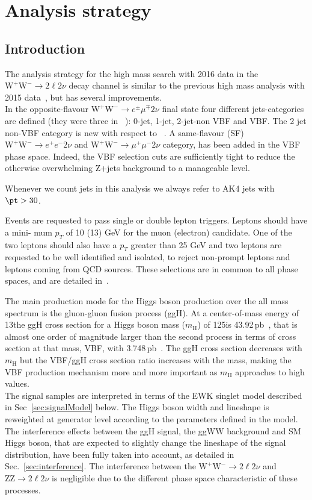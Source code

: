 \section{Analysis strategy}\label{sec:AnalysisStrategy}

\subsection{Introduction}
The analysis strategy for the high mass search with 2016 data in the
$\mathrm{W^+W^-}\to2\ell2\nu$ decay channel  is similar to the previous high
mass analysis with 2015 data~\cite{CMS-PAS-HIG-16-023}, but has several improvements. \\
In the opposite-flavour $\mathrm{W^+W^-}\to e^{\pm} \mu^{\mp} 2\nu$ final
state four different jets-categories are defined (they were three in
~\cite{CMS-PAS-HIG-16-023}): 0-jet, 1-jet, 2-jet-non VBF and VBF. The 2 jet
non-VBF category is new with respect to ~\cite{CMS-PAS-HIG-16-023}.
A same-flavour (SF) $\mathrm{W^+W^-}\to e^+ e^- 2\nu$ and $\mathrm{W^+W^-}\to
\mu^+ \mu^- 2\nu$ category, has been added in the VBF phase space. Indeed, the VBF
selection cuts are sufficiently tight to reduce the otherwise overwhelming
Z+jets background to a manageable level.

Whenever we count jets in this analysis we always refer to AK4 jets with $\pt>30$\GeV.

Events are requested to pass single or double lepton triggers. Leptons should have a mini-
mum $p_T$ of 10 (13) GeV for the muon (electron) candidate. One of the two leptons should also
have a $p_T$ greater than 25 GeV and two leptons are requested to be well identified and isolated,
to reject non-prompt leptons and leptons coming from QCD sources. These selections are in
common to all phase spaces, and are detailed in~\cite{AN-17-082}.


The main production mode for the Higgs boson production over the all mass spectrum is the gluon-gluon fusion process (ggH). At a center-of-mass energy of 13\TeV the ggH cross section for a Higgs boson mass ($m_\mathrm{H}$) of 125\GeV is 43.92\,pb~\cite{temphiggsxsecs}, that is almost one order of magnitude larger than the second process  in terms of cross section at that mass, VBF, with 3.748\,pb~\cite{temphiggsxsecs}. The ggH cross section decreases with $m_\mathrm{H}$ but the VBF/ggH cross section ratio increases with the mass, making the VBF production mechanism more and more important as $m_\mathrm{H}$ approaches to high values.\\
The signal samples are interpreted in terms of the EWK singlet model described
in Sec~\ref{sec:signalModel} below. The Higgs boson width and lineshape is reweighted at generator level according to the parameters defined in the model.
The interference effects between the ggH signal, the ggWW background and SM
Higgs boson, that are expected to slightly change the lineshape of the signal
distribution, have been fully taken into account, as detailed in
Sec.~\ref{sec:interference}. The interference between the $\mathrm{W^+W^-}\to2\ell2\nu$ and $\mathrm{ZZ}\to2\ell2\nu$ is negligible due to the different phase space characteristic of these processes. 

